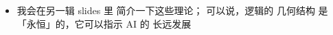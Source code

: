\documentclass[16pt]{beamer}
\newcommand{\cc}[2]{#1}
\newcommand{\cc}[2]{#2}
\begin{document}
\begin{frame}[fragile]
\begin{itemize}
	
	
	\item \cc{我会在另一辑 slides 里 简介一下这些理论； 可以说，逻辑的 几何结构 是「永恒」的，它可以指示 AI 的 长远发展}
	{In another set of slides we shall explore this connection.  One could say the mathematical structure of logic is ``eternal'';  It will provide guidance for the long-term development of AI}
	
\end{itemize}
\end{frame}
\end{document}
